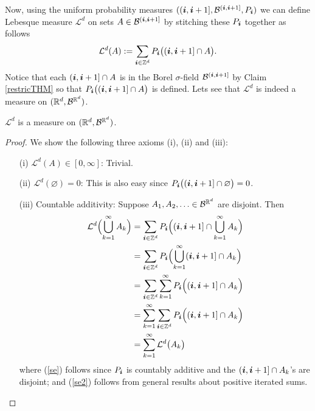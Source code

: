 Now, using the uniform probability measures $((\boldsymbol i, \boldsymbol i +1],\mathcal B^{(\boldsymbol i,\boldsymbol i+1] }, P_{\boldsymbol i})$ we can define Lebesque measure $\mathcal L^d$ on sets $A\in\mathcal B^{(\boldsymbol i,\boldsymbol i+1] }$ by stitching these $P_{\boldsymbol i}$ together as follows
\begin{equation}
\label{Lm}
 \mathcal L^d(A):= \sum_{\boldsymbol i\in\Bbb Z^d} P_{\boldsymbol i}\bigl( (\boldsymbol i, \boldsymbol i+1]\cap A\bigr).
 \end{equation}
Notice that each $ (\boldsymbol i, \boldsymbol i+1]\cap A$ is in the Borel $\sigma$-field $\mathcal B^{(\boldsymbol i,\boldsymbol i+1] }$ by Claim \ref{restricTHM} so that
$P_{\boldsymbol i}\bigl( (\boldsymbol i, \boldsymbol i+1]\cap A\bigr)$ is defined.
Lets see that $\mathcal L^d$ is indeed a measure on $(\Bbb R^d,\mathcal B^{\Bbb R^d })$.


\begin{theorem}
 $\mathcal L^d$  is a measure on $(\Bbb R^d,\mathcal B^{\Bbb R^d })$.
\end{theorem}
\begin{proof}
We show the following three axioms (i), (ii) and (iii):
\begin{enumerate}
\item[(i)] $\mathcal L^d(A)\in [0,\infty]$: Trivial.
 \item[(ii)]  $\mathcal L^d(\varnothing)=0$: This is also easy since $P_{\boldsymbol i}\bigl( (\boldsymbol i, \boldsymbol i+1]\cap \varnothing\bigr)=0$.
\item[(iii)] Countable additivity: Suppose $A_1,A_2,\ldots\in\mathcal B^{\Bbb R^d }$ are disjoint. Then
\begin{align}
\mathcal L^d\Bigl (\bigcup_{k=1}^\infty A_k\Bigr)&=\sum_{\boldsymbol i\in\Bbb Z^d} P_{\boldsymbol i}\Bigl((\boldsymbol i, \boldsymbol i+1] \cap \bigcup_{k=1}^\infty A_k \Bigr) \nonumber\\
&=\sum_{\boldsymbol i\in\Bbb Z^d} P_{\boldsymbol i}\Bigl( \bigcup_{k=1}^\infty (\boldsymbol i, \boldsymbol i+1] \cap A_k \Bigr) \nonumber\\
&=\sum_{\boldsymbol i\in\Bbb Z^d} \sum_{k=1}^\infty P_{\boldsymbol i} \Bigl((\boldsymbol i, \boldsymbol i+1] \cap A_k \Bigr)\label{se} \\
&=\sum_{k=1}^\infty  \sum_{\boldsymbol i\in\Bbb Z^d} P_{\boldsymbol i} \Bigl((\boldsymbol i, \boldsymbol i+1] \cap A_k \Bigr)\label{se2} \\
&=\sum_{k=1}^\infty  \mathcal L^d\bigl (A_k \bigr) \nonumber
\end{align}
where (\ref{se}) follows since $P_{\boldsymbol i}$ is countably additive and the $ (\boldsymbol i, \boldsymbol i+1]\cap A_k $'s are disjoint; and (\ref{se2}) follows from general results about positive iterated sums.
\end{enumerate}
\end{proof}



